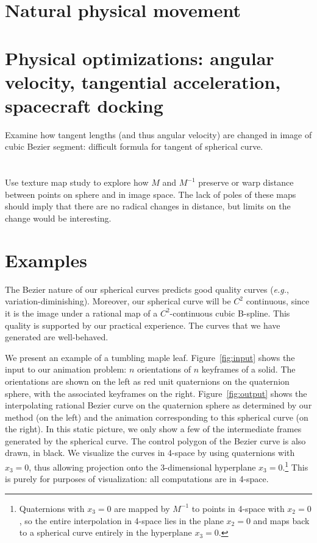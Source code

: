 \section{Natural physical movement}

\section{Physical optimizations: angular velocity, tangential acceleration,
	spacecraft docking}

Examine how tangent lengths (and thus angular velocity) are changed
in image of cubic Bezier segment: difficult formula for tangent
of spherical curve.

\section{}

Use texture map study to explore how $M$ and $M^{-1}$ preserve or warp
distance between points on sphere and in image space.
The lack of poles of these maps should imply that there are no radical
changes in distance, but limits on the change would be interesting.

\section{Examples}
\label{sec:eg}

The Bezier nature of our spherical curves predicts good quality curves
({\em e.g.}, variation-diminishing).
Moreover, our spherical curve will be $C^2$ continuous, since it is the image
under a rational map of a $C^2$-continuous cubic B-spline.
This quality is supported by our practical experience.
The curves that we have generated are well-behaved.

We present an example of a tumbling maple leaf.
Figure~\ref{fig:input} shows the input to our animation problem:
$n$ orientations of $n$ keyframes of a solid.
The orientations are shown on the left as red unit quaternions
on the quaternion sphere, with the associated keyframes on the right.
Figure~\ref{fig:output} shows the interpolating rational Bezier curve
on the quaternion sphere as determined by our method (on the left)
and the animation corresponding to this spherical curve (on the right).
In this static picture, we only show a few of the intermediate frames
generated by the spherical curve.
The control polygon of the Bezier curve is also drawn, in black.
We visualize the curves in 4-space by using quaternions with $x_3=0$,
thus allowing projection onto the 3-dimensional hyperplane 
$x_3=0$.\footnote{Quaternions with $x_3=0$ are mapped by $M^{-1}$ to points
	in 4-space with $x_2=0$, so the entire interpolation in 4-space
	lies in the plane $x_2=0$ and maps back to a spherical curve
	entirely in the hyperplane $x_3=0$.}
This is purely for purposes of visualization: all computations
are in 4-space.


